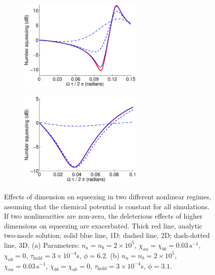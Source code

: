 \documentclass{iopart}
\begin{document}
\begin{figure}
  \centering
  \begin{subfigure}{.5\textwidth}
    \centering
    \includegraphics[width=6cm]{figures/dimensional_effects_on_squeezing_1.eps}
    \label{figDimensionalSqueezingEffects:sub1}
  \end{subfigure}%
  \begin{subfigure}{.5\textwidth}
    \centering
    \includegraphics[width=6cm]{figures/dimensional_effects_on_squeezing_2.eps}
    \label{figDimensionalSqueezingEffects:sub2}
  \end{subfigure}
\caption{Effects of dimension on squeezing in two different nonlinear regimes, assuming that the chemical potential is constant for all simulations. If two nonlinearities are non-zero, the deleterious effects of higher dimensions on squeezing are exacerbated. Thick red line, analytic two-mode solution; solid blue line, 1D; dashed line, 2D; dash-dotted line, 3D. (a) Parameters: $n_a = n_b =2 \times 10^5$, $\chi_{aa}=\chi_{bb}=0.03\,\text{s}^{-1}$, $\chi_{ab}=0$, $\tau_{\mathrm{hold}}=3\times 10^{-4}$s, $\phi=6.2$. (b) $n_a = n_b =2 \times 10^5$, $\chi_{aa}=0.03\,\text{s}^{-1}$, $\chi_{bb}=\chi_{ab}=0$, $\tau_{\mathrm{hold}}=3\times 10^{-4}$s, $\phi=3.1$.}
  \label{figDimensionalSqueezingEffects}
\end{figure}
\end{document}
